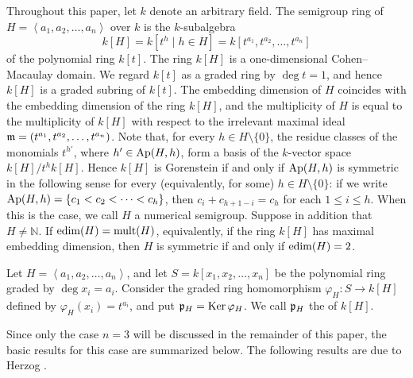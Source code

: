 Throughout this paper, let $k$ denote an arbitrary field. The semigroup ring of $H = \left<a_1, a_2, \ldots , a_n\right>$ over $k$ is the $k$-subalgebra 
$$
k[H] = k[t^h \mid h \in H] = k[t^{a_1}, t^{a_2}, \ldots , t^{a_n}]
$$
of the polynomial ring $k[t]$. The ring $k[H]$ is a one-dimensional Cohen--Macaulay domain. We regard $k[t]$ as a graded ring by $\deg t =1$, and hence $k[H]$ is a graded subring of $k[t]$.
The embedding dimension of $H$ coincides with the embedding dimension of the ring $k[H]$, and the multiplicity of $H$ is equal to the multiplicity of $k[H]$ with respect to the irrelevant maximal ideal $\mathfrak{m} = (t^{a_1}, t^{a_2}, \ldots , t^{a_n})$.
Note that, for every $h \in H\setminus \{0\}$, the residue classes of the monomials $t^{h'}$, where $h'\in\operatorname{Ap}(H,h)$, form a basis of the $k$-vector space $k[H]/t^hk[H]$. 
Hence $k[H]$ is Gorenstein if and only if $\operatorname{Ap}(H,h)$ is symmetric in the following sense for every (equivalently, for some) $h\in H \setminus \{0\}$: if we write $\operatorname{Ap}(H,h) = \{c_1 < c_2 < \cdots < c_h\}$, then $c_i + c_{h+1-i} = c_h$ for each $1 \le i \le h$. When this is the case, we call $H$ a  numerical semigroup.
Suppose in addition that $H\ne\mathbb N$. If $\operatorname{edim}(H)=\operatorname{mult}(H)$, equivalently, if the ring $k[H]$ has maximal embedding dimension, then $H$ is symmetric if and only if $\operatorname{edim}(H) = 2$.

Let $H=\left<a_1, a_2, \ldots ,a_n\right>$, and let $S=k[x_1, x_2, \ldots , x_n]$ be the polynomial ring graded by $\deg x_i =a_i$.
Consider the graded ring homomorphism $\varphi_H: S \to k[H]$ defined by $\varphi_H(x_i) = t^{a_i}$, and put $\mathfrak{p}_H = \operatorname{Ker} \varphi_H$. We call $\mathfrak{p}_H$ the  of $k[H]$.

Since only the case $n=3$ will be discussed in the remainder of this paper, the basic results for this case are summarized below. The following results are due to Herzog \cite{Herzog1970}.


